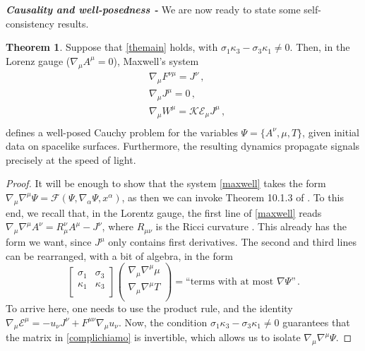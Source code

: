 \documentclass[a4paper, amsfonts, amssymb, amsmath, reprint, showkeys, nofootinbib, twoside,notitlepage]{revtex4-1}
\newcommand{\K}{{\mathcal{K}}}
\theoremstyle{definition}
\theoremstyle{theorem}
\newtheorem{theorem}{Theorem}
\begin{document}
\noindent\textit{\bf Causality and well-posedness -} We are now ready to state some self-consistency results.
\begin{theorem}
Suppose that \eqref{themain} holds, with $\sigma_1\kappa_3-\sigma_3 \kappa_1\neq 0$. Then, in the Lorenz gauge \textup{(}$\nabla_\mu A^\mu {=}0$\textup{)}, Maxwell's system
\begin{equation}\label{maxwell}
\begin{split}
& \nabla_\mu F^{\nu \mu} =J^\nu \, , \\
& \nabla_\mu J^{\mu} =0 \, , \\
& \nabla_\mu W^{\mu} =\K \mathcal{E}_\mu J^\mu \, , \\
\end{split}
\end{equation} 
defines a well-posed Cauchy problem for the variables $\Psi{=}\{A^\nu,\mu,T\}$, given initial data on spacelike surfaces. Furthermore, the resulting dynamics propagate signals precisely at the speed of light.
\end{theorem}
\begin{proof}
It will be enough to show that the system \eqref{maxwell} takes the form $\nabla_\mu \nabla^\mu \Psi =\mathcal{F}(\Psi,\nabla_\alpha\Psi,x^\alpha)$, as then we can invoke Theorem 10.1.3 of \cite{Wald}. To this end, we recall that, in the Lorentz gauge, the first line of \eqref{maxwell} reads $\nabla_\mu \nabla^\mu A^\nu =R^\nu _\mu A^\mu {-}J^\nu$, where $R_{\mu \nu}$ is the Ricci curvature \cite[\S 22.4]{MTW_book}. This already has the form we want, since $J^\mu$ only contains first derivatives. The second and third lines can be rearranged, with a bit of algebra, in the form
\begin{equation}\label{complichiamo}
\begin{bmatrix}
\sigma_1 & \sigma_3 \\
\kappa_1 & \kappa_3 \\
\end{bmatrix}
\begin{pmatrix}
\nabla_\mu \nabla^\mu \mu \\
\nabla_\mu \nabla^\mu T \\
\end{pmatrix}
= \text{``terms with at most }\nabla\Psi\text{''} \, .
\end{equation}
To arrive here, one needs to use the product rule, and the identity $\nabla_\mu \mathcal{E}^\mu=-u_\nu J^\nu +F^{\mu \nu}\nabla_\mu u_\nu$. Now, the condition $\sigma_1\kappa_3-\sigma_3 \kappa_1\neq 0$ guarantees that the matrix in \eqref{complichiamo} is invertible, which allows us to isolate $\nabla_\mu \nabla^\mu \Psi$.
\end{proof}
\end{document}
